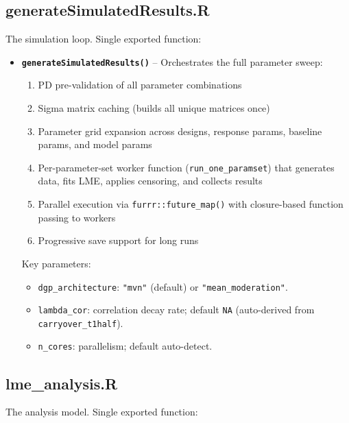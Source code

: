\documentclass[11pt]{article}
\begin{document}
\subsection{generateSimulatedResults.R}

The simulation loop. Single exported function:

\begin{itemize}
  \item \textbf{\texttt{generateSimulatedResults()}} -- Orchestrates the full
    parameter sweep:
    \begin{enumerate}
      \item PD pre-validation of all parameter combinations
      \item Sigma matrix caching (builds all unique matrices once)
      \item Parameter grid expansion across designs, response
        params, baseline params, and model params
      \item Per-parameter-set worker function
        (\texttt{run\_one\_paramset}) that generates data, fits LME,
        applies censoring, and collects results
      \item Parallel execution via \texttt{furrr::future\_map()} with
        closure-based function passing to workers
      \item Progressive save support for long runs
    \end{enumerate}

    Key parameters:
    \begin{itemize}
      \item \texttt{dgp\_architecture}: \texttt{"mvn"} (default)
        or \texttt{"mean\_moderation"}.
      \item \texttt{lambda\_cor}: correlation decay rate;
        default \texttt{NA} (auto-derived from
        \texttt{carryover\_t1half}).
      \item \texttt{n\_cores}: parallelism; default
        auto-detect.
    \end{itemize}
\end{itemize}

\subsection{lme\_analysis.R}

The analysis model. Single exported function:
\end{document}
